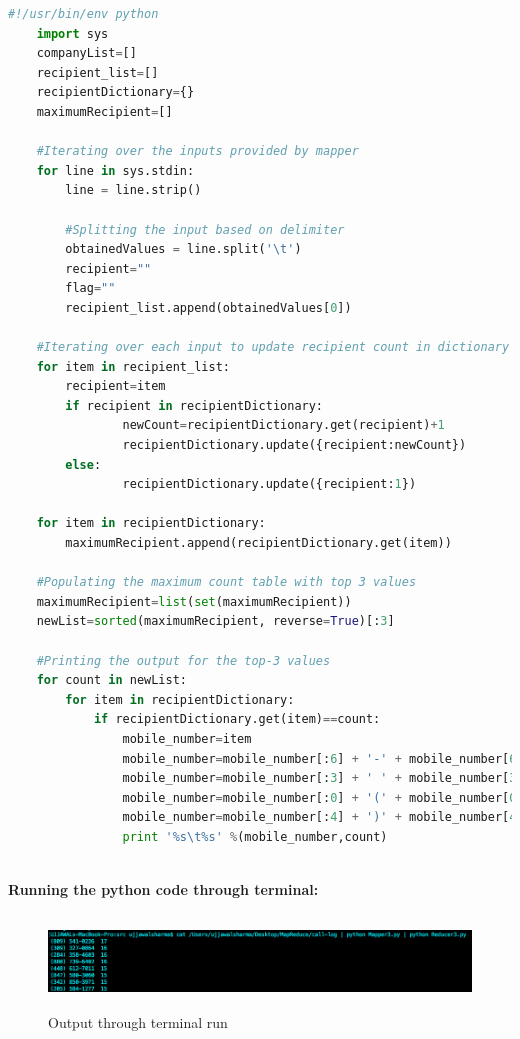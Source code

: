 \documentclass[a4paper, 10pt]{article}
\begin{document}
\begin{lstlisting}[language=Python, caption=Reducer for problem 3]
    #!/usr/bin/env python
    import sys
    companyList=[]
    recipient_list=[]
    recipientDictionary={}
    maximumRecipient=[]

    #Iterating over the inputs provided by mapper
    for line in sys.stdin:
        line = line.strip()

        #Splitting the input based on delimiter
        obtainedValues = line.split('\t')
        recipient=""
        flag=""
        recipient_list.append(obtainedValues[0])

    #Iterating over each input to update recipient count in dictionary
    for item in recipient_list:
        recipient=item
        if recipient in recipientDictionary:
                newCount=recipientDictionary.get(recipient)+1
                recipientDictionary.update({recipient:newCount}) 
        else:
                recipientDictionary.update({recipient:1})
        
    for item in recipientDictionary:
        maximumRecipient.append(recipientDictionary.get(item))

    #Populating the maximum count table with top 3 values
    maximumRecipient=list(set(maximumRecipient))
    newList=sorted(maximumRecipient, reverse=True)[:3]
    
    #Printing the output for the top-3 values
    for count in newList:
        for item in recipientDictionary:
            if recipientDictionary.get(item)==count:
                mobile_number=item
                mobile_number=mobile_number[:6] + '-' + mobile_number[6:]
                mobile_number=mobile_number[:3] + ' ' + mobile_number[3:]
                mobile_number=mobile_number[:0] + '(' + mobile_number[0:]
                mobile_number=mobile_number[:4] + ')' + mobile_number[4:]
                print '%s\t%s' %(mobile_number,count)
         
\end{lstlisting}

\noindent
\textbf{Running the python code through terminal:}
\begin{figure}[!htbp]
    \centering
    \includegraphics[height=2.5cm]{Question3.png}
    \caption{Output through terminal run}
\end{figure}
\end{document}
